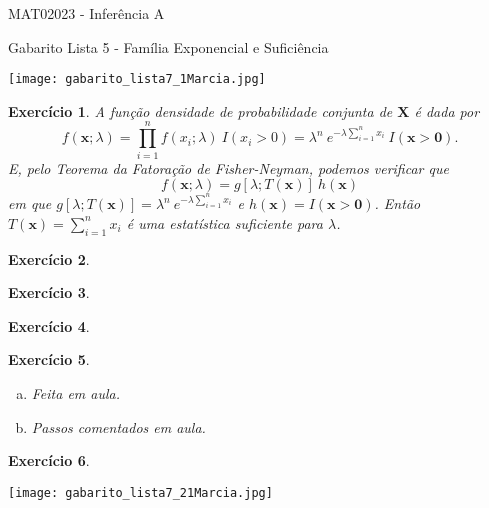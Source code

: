 \documentclass[letter,11pt]{article}
\newtheorem{exer}{Exercício}
\begin{document}
\begin{center}{ \Large MAT02023 - Inferência A }\end{center}

\begin{center}
{\large  \sc Gabarito Lista 5 - Família Exponencial e Suficiência}
\end{center}
\vspace{15mm}

\texttt{[image: gabarito\_lista7\_1Marcia.jpg]}



\medskip
\setcounter{exer}{5}
\begin{exer} \rm
A função densidade de probabilidade conjunta de $\boldsymbol{X}$ é dada por
$$f(\boldsymbol{x}; \lambda) = \prod_{i=1}^n f(x_i; \lambda) \: I(x_i > 0) = \lambda^n \: e^{-\lambda \sum_{i=1}^n x_i} \: I(\boldsymbol{x} > \boldsymbol{0}).$$
E, pelo Teorema da Fatoração de Fisher-Neyman, podemos verificar que 
$$f(\boldsymbol{x}; \lambda) = g[\lambda; T(\boldsymbol{x})] \: h(\boldsymbol{x})$$
em que $g[\lambda; T(\boldsymbol{x})] = \lambda^n \: e^{-\lambda \sum_{i=1}^n x_i}$ e $h(\boldsymbol{x}) = I(\boldsymbol{x} > \boldsymbol{0})$. Então $T(\boldsymbol{x}) = \sum_{i=1}^n x_i$ é uma estatística suficiente para $\lambda$.

\end{exer}

\medskip
\begin{exer} \rm
\end{exer}

\medskip
\begin{exer} \rm
\end{exer}

\medskip
\begin{exer} \rm
\end{exer}

\medskip
\begin{exer} \rm
\begin{enumerate}[a)]
  \item Feita em aula.  
  \item Passos comentados em aula.  
\end{enumerate}
\end{exer}

\medskip
\begin{exer} \rm
\end{exer}
\texttt{[image: gabarito\_lista7\_21Marcia.jpg]}
\end{document}
